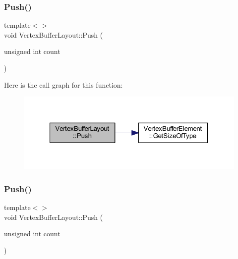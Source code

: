 \subsubsection{\texorpdfstring{Push()}{Push()}\hspace{0.1cm}{\footnotesize\ttfamily [2/4]}}
{\footnotesize\ttfamily template$<$$>$ \\
void Vertex\+Buffer\+Layout\+::\+Push (\begin{DoxyParamCaption}\item[{unsigned int}]{count }\end{DoxyParamCaption})\hspace{0.3cm}{\ttfamily [inline]}}

Here is the call graph for this function\+:
\nopagebreak
\begin{figure}[H]
\begin{center}
\leavevmode
\includegraphics[width=321pt]{class_vertex_buffer_layout_a0ac1e4373209bf1a2c5c3551f690724b_cgraph}
\end{center}
\end{figure}
\mbox{\label{class_vertex_buffer_layout_a0ac1e4373209bf1a2c5c3551f690724b}} 
\subsubsection{\texorpdfstring{Push()}{Push()}\hspace{0.1cm}{\footnotesize\ttfamily [3/4]}}
{\footnotesize\ttfamily template$<$$>$ \\
void Vertex\+Buffer\+Layout\+::\+Push (\begin{DoxyParamCaption}\item[{unsigned int}]{count }\end{DoxyParamCaption})\hspace{0.3cm}{\ttfamily [inline]}}

